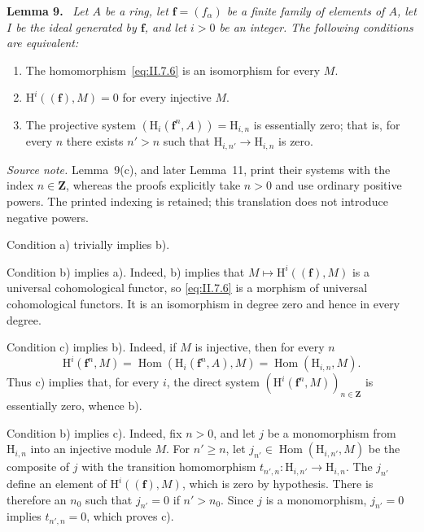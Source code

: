 \documentclass[11pt,a4paper,oneside]{book}
\providecommand{\srcpage}[1]{%
  \marginpar{\raggedright\scriptsize\color{gray}Original French p.~#1}}
\providecommand{\ZZ}{\mathbf Z}
\providecommand{\ffam}{\mathbf f}
\newenvironment{sgastatement}[1]
  {\par\addvspace{0.8\baselineskip}\noindent\textbf{#1.}\ \itshape}
  {\par\addvspace{0.35\baselineskip}}
\theoremstyle{plain}
\theoremstyle{definition}
\theoremstyle{remark}
\begin{document}
\begin{sgastatement}{Lemma 9}
Let $A$\srcpage{24} be a ring, let $\ffam=(f_\alpha)$ be a finite family of
elements of $A$, let $I$ be the ideal generated by $\ffam$, and let $i>0$ be
an integer. The following conditions are equivalent:
\begin{enumerate}[label=\textup{\alph*)},leftmargin=2.5em]
  \item The homomorphism~\eqref{eq:II.7.6} is an isomorphism for every $M$.
  \item $\mathrm H^i((\ffam),M)=0$ for every injective $M$.
  \item The projective system
  $(\mathrm H_i(\ffam^n,A))=\mathrm H_{i,n}$ is essentially zero; that is,
  for every $n$ there exists $n'>n$ such that
  $\mathrm H_{i,n'}\to\mathrm H_{i,n}$ is zero.
\end{enumerate}
\end{sgastatement}

\noindent\textit{Source note.} Lemma~9(c), and later Lemma~11, print their
systems with the index $n\in\ZZ$, whereas the proofs explicitly take $n>0$
and use ordinary positive powers. The printed indexing is retained; this
translation does not introduce negative powers.

Condition a) trivially implies b).

Condition b) implies a). Indeed, b) implies that
$M\mapsto\mathrm H^i((\ffam),M)$ is a universal cohomological functor, so
\eqref{eq:II.7.6} is a morphism of universal cohomological functors. It is an
isomorphism in degree zero and hence in every degree.

Condition c) implies b). Indeed, if $M$ is injective, then for every $n$
\[
  \mathrm H^i(\ffam^n,M)
  =\operatorname{Hom}(\mathrm H_i(\ffam^n,A),M)
  =\operatorname{Hom}(\mathrm H_{i,n},M).
\]
Thus c) implies that, for every $i$, the direct system
$(\mathrm H^i(\ffam^n,M))_{n\in\ZZ}$ is essentially zero, whence b).

Condition b) implies c). Indeed, fix $n>0$, and let $j$ be a monomorphism
from $\mathrm H_{i,n}$ into an injective module $M$. For $n'\geq n$, let
$j_{n'}\in\operatorname{Hom}(\mathrm H_{i,n'},M)$ be the composite of $j$
with the transition homomorphism
$t_{n',n}\colon\mathrm H_{i,n'}\to\mathrm H_{i,n}$. The $j_{n'}$ define an
element of $\mathrm H^i((\ffam),M)$, which is zero by hypothesis. There is
therefore an $n_0$ such that $j_{n'}=0$ if $n'>n_0$. Since $j$ is a
monomorphism, $j_{n'}=0$ implies $t_{n',n}=0$, which proves c).
\end{document}
